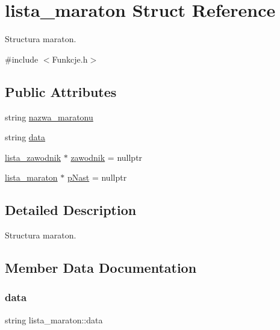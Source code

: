 \hypertarget{structlista__maraton}{}\section{lista\+\_\+maraton Struct Reference}
\label{structlista__maraton}


Structura maraton.  




{\ttfamily \#include $<$Funkcje.\+h$>$}

\subsection*{Public Attributes}
\begin{DoxyCompactItemize}
\item 
string \mbox{\hyperlink{structlista__maraton_ab7ff5a8e5918e7a65ec9c40a3943c959}{nazwa\+\_\+maratonu}}
\item 
string \mbox{\hyperlink{structlista__maraton_afd2f90e1c163d692e0cdb02a7873256d}{data}}
\item 
\mbox{\hyperlink{structlista__zawodnik}{lista\+\_\+zawodnik}} $\ast$ \mbox{\hyperlink{structlista__maraton_a12fc36d25a15f51e84b57fc88965948f}{zawodnik}} = nullptr
\item 
\mbox{\hyperlink{structlista__maraton}{lista\+\_\+maraton}} $\ast$ \mbox{\hyperlink{structlista__maraton_ac2d0360063ec23f4901fe84b92d886bf}{p\+Nast}} = nullptr
\end{DoxyCompactItemize}


\subsection{Detailed Description}
Structura maraton. 

\subsection{Member Data Documentation}
\mbox{\label{structlista__maraton_afd2f90e1c163d692e0cdb02a7873256d}} 
\subsubsection{\texorpdfstring{data}{data}}
{\footnotesize\ttfamily string lista\+\_\+maraton\+::data}

